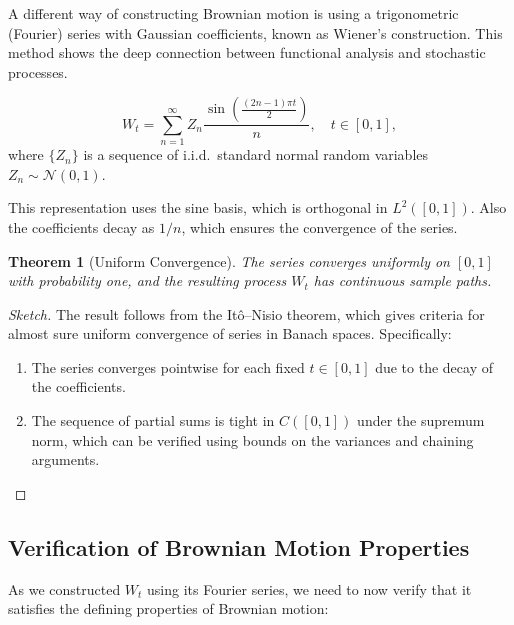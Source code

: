\documentclass[12pt]{report}
\newtheorem{theorem}{Theorem}[section]
\begin{document}
A different way of constructing Brownian motion is using a trigonometric (Fourier) series with Gaussian coefficients, known as Wiener’s construction. This method shows the deep connection between functional analysis and stochastic processes.

\begin{equation*}
W_t = \sum_{n=1}^\infty Z_n \frac{\sin\left( \frac{(2n-1)\pi t}{2} \right)}{n}, \quad t \in [0,1],
\end{equation*}
where \( \{Z_n\} \) is a sequence of i.i.d.\ standard normal random variables \( Z_n \sim \mathcal{N}(0,1) \).

This representation uses the sine basis, which is orthogonal in \(L^2([0,1])\). Also the coefficients decay as \(1/n\), which ensures the convergence of the series.

\begin{theorem}[Uniform Convergence] \cite{bobrowski}
The series converges uniformly on \([0,1]\) with probability one, and the resulting process \(W_t\) has continuous sample paths.
\end{theorem}

\begin{proof}[Sketch]
The result follows from the Itô–Nisio theorem, which gives criteria for almost sure uniform convergence of series in Banach spaces. Specifically:
\begin{enumerate}[label=(\roman*)]
    \item The series converges pointwise for each fixed \(t \in [0,1]\) due to the decay of the coefficients.
    \item The sequence of partial sums is tight in \(C([0,1])\) under the supremum norm, which can be verified using bounds on the variances and chaining arguments.
\end{enumerate}
\end{proof}

\subsection{Verification of Brownian Motion Properties}

As we constructed \(W_t\) using its Fourier series, we need to now verify that it satisfies the defining properties of Brownian motion:
\end{document}
